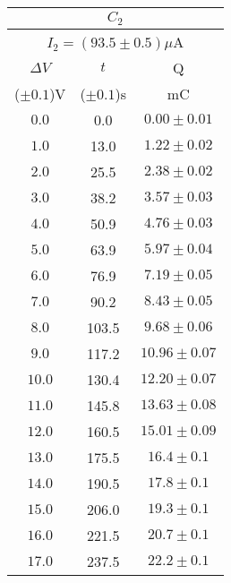 \documentclass[11pt]{article}
\begin{document}
\begin{minipage}{0.45\textwidth}
\begin{center}
\begin{tabular}{|c|c|c|}
	\hline
	\multicolumn{3}{|c|}{$C_{2}$}\\
	\hline
	\multicolumn{3}{|c|}{$I_{2}=(93.5\pm 0.5)\mu$A}\\
	\hline
	$\Delta V $  & $t$          & Q\\
	($\pm 0.1$)V & ($\pm 0.1$)s & mC\\
	\hline
	$ 0.0$ &   0.0 & $ 0.00\pm 0.01$\\
	$ 1.0$ &  13.0 & $ 1.22\pm 0.02$\\
	$ 2.0$ &  25.5 & $ 2.38\pm 0.02$\\
	$ 3.0$ &  38.2 & $ 3.57\pm 0.03$\\
	$ 4.0$ &  50.9 & $ 4.76\pm 0.03$\\
	$ 5.0$ &  63.9 & $ 5.97\pm 0.04$\\
	$ 6.0$ &  76.9 & $ 7.19\pm 0.05$\\
	$ 7.0$ &  90.2 & $ 8.43\pm 0.05$\\
	$ 8.0$ & 103.5 & $ 9.68\pm 0.06$\\
	$ 9.0$ & 117.2 & $10.96\pm 0.07$\\
	$10.0$ & 130.4 & $12.20\pm 0.07$\\
	$11.0$ & 145.8 & $13.63\pm 0.08$\\
	$12.0$ & 160.5 & $15.01\pm 0.09$\\
	$13.0$ & 175.5 & $16.4 \pm 0.1 $\\
	$14.0$ & 190.5 & $17.8 \pm 0.1 $\\
	$15.0$ & 206.0 & $19.3 \pm 0.1 $\\
	$16.0$ & 221.5 & $20.7 \pm 0.1 $\\
	$17.0$ & 237.5 & $22.2 \pm 0.1 $\\
	\hline
\end{tabular}
\end{center}
\end{minipage}
\end{document}
